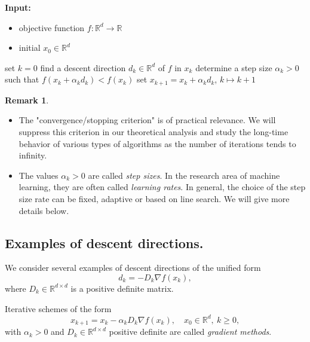 \documentclass[12pt,openany]{book}
\theoremstyle{definition}
\newtheorem{remark}[thm]{Remark}
\theoremstyle{definition}
\newcommand{\R}{\mathbb{R}}
\begin{document}
\begin{algorithm}[htb!]
\begin{algorithmic}[1]
\State \textbf{Input:} \begin{itemize}
 \item objective function $f:\R^d\to\R$
 \item initial $x_0\in\R^d$
 \end{itemize}
 \State set $k=0$
	\State find a descent direction $d_k\in\R^d$ of $f$ in $x_k$
	\State determine a step size $\alpha_k>0$ such that $f(x_k+\alpha_k d_k)< f(x_k)$
	\State set $x_{k+1} = x_k +\alpha_k d_k$, $k \mapsto k+1$
\EndWhile
\end{algorithmic}
 \caption{Descent method}\label{alg:DM}
\end{algorithm}

\begin{remark}
\begin{itemize}
\item The "convergence/stopping criterion" is of practical relevance. We will suppress this criterion in our theoretical analysis and study the long-time behavior of various types of algorithms as the number of iterations tends to infinity.
\item The values $\alpha_k>0$ are called \textit{step sizes}. In the research area of machine learning, they are often called \textit{learning rates}. In general, the choice of the step size rate can be fixed, adaptive or based on line search. We will give more details below. 
\end{itemize}
\end{remark}

\subsection{Examples of descent directions.}
We consider several examples of descent directions of the unified form
\begin{equation}
d_k = -D_k\nabla f(x_k),
\end{equation}
where $D_k\in\R^{d\times d}$ is a positive definite matrix.

\begin{defi}
Iterative schemes of the form
\begin{equation}
x_{k+1} = x_k - \alpha_k D_k \nabla f(x_k),\quad x_0\in\R^d,\ k\ge0,
\end{equation}
with $\alpha_k>0$ and $D_k\in\R^{d\times d}$ positive definite are called \textit{gradient methods}.
\end{defi}
\end{document}
